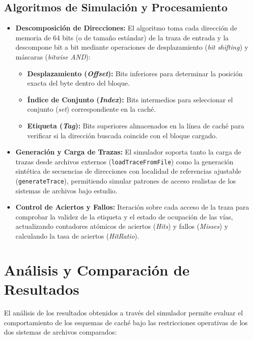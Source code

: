 \documentclass[12pt,a4paper]{article}
\begin{document}
\subsection{Algoritmos de Simulación y Procesamiento}
\begin{itemize}
    \item \textbf{Descomposición de Direcciones:} El algoritmo toma cada dirección de memoria de 64 bits (o de tamaño estándar) de la traza de entrada y la descompone bit a bit mediante operaciones de desplazamiento (\textit{bit shifting}) y máscaras (\textit{bitwise AND}):
    \begin{itemize}
        \item \textbf{Desplazamiento (\textit{Offset}):} Bits inferiores para determinar la posición exacta del byte dentro del bloque.
        \item \textbf{Índice de Conjunto (\textit{Index}):} Bits intermedios para seleccionar el conjunto (\textit{set}) correspondiente en la caché.
        \item \textbf{Etiqueta (\textit{Tag}):} Bits superiores almacenados en la línea de caché para verificar si la dirección buscada coincide con el bloque cargado.
    \end{itemize}
    \item \textbf{Generación y Carga de Trazas:} El simulador soporta tanto la carga de trazas desde archivos externos (\texttt{loadTraceFromFile}) como la generación sintética de secuencias de direcciones con localidad de referencias ajustable (\texttt{generateTrace}), permitiendo simular patrones de acceso realistas de los sistemas de archivos bajo estudio. 
    \item \textbf{Control de Aciertos y Fallos:} Iteración sobre cada acceso de la traza para comprobar la validez de la etiqueta y el estado de ocupación de las vías, actualizando contadores atómicos de aciertos (\textit{Hits}) y fallos (\textit{Misses}) y calculando la tasa de aciertos (\textit{HitRatio}). 
\end{itemize}

\section{Análisis y Comparación de Resultados}
El análisis de los resultados obtenidos a través del simulador permite evaluar el comportamiento de los esquemas de caché bajo las restricciones operativas de los dos sistemas de archivos comparados: 
\end{document}
